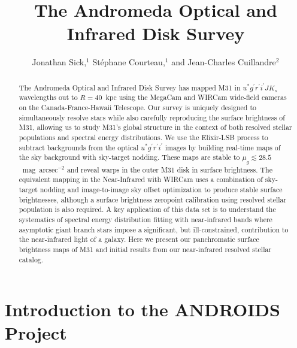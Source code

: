 \documentclass[11pt,twoside]{article}
\begin{document}
\title{The Andromeda Optical and Infrared Disk Survey}
\author{Jonathan Sick,$^1$ St\'{e}phane Courteau,$^1$ and Jean-Charles Cuillandre$^2$}

\begin{abstract}
The Andromeda Optical and Infrared Disk Survey has mapped M31 in $u^* g^\prime r^\prime i^\prime J K_s$ wavelengths out to $R=40$~kpc using the MegaCam and WIRCam wide-field cameras on the Canada-France-Hawaii Telescope.
Our survey is uniquely designed to simultaneously resolve stars while also carefully reproducing the surface brightness of M31, allowing us to study M31's global structure in the context of both resolved stellar populations and spectral energy distributions.
We use the Elixir-LSB process to subtract backgrounds from the optical $u^* g^\prime r^\prime i^\prime$ images by building real-time maps of the sky background with sky-target nodding.
These maps are stable to $\mu_g \lesssim 28.5$~mag~arcsec$^{-2}$ and reveal warps in the outer M31 disk in surface brightness.
The equivalent mapping in the Near-Infrared with WIRCam uses a combination of sky-target nodding and image-to-image sky offset optimization to produce stable surface brightnesses, although a surface brightness zeropoint calibration using resolved stellar population is also required.
A key application of this data set is to understand the systematics of spectral energy distribution fitting with near-infrared bands where asymptotic giant branch stars impose a significant, but ill-constrained, contribution to the near-infrared light of a galaxy.
Here we present our panchromatic surface brightness maps of M31 and initial results from our near-infrared resolved stellar catalog.
\end{abstract}

\section{Introduction to the ANDROIDS Project}
\end{document}
